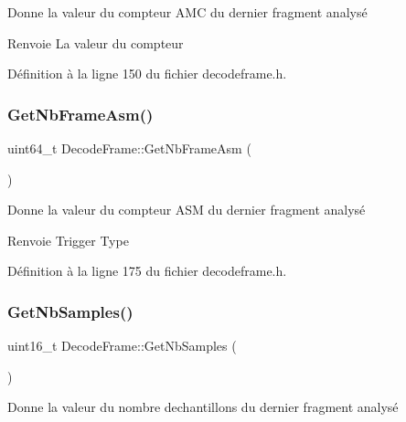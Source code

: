 Donne la valeur du compteur A\+MC du dernier fragment analysé 

\begin{DoxyReturn}{Renvoie}
La valeur du compteur 
\end{DoxyReturn}


Définition à la ligne 150 du fichier decodeframe.\+h.

\mbox{\label{class_decode_frame_affbc2d0f3774cb4fff34b42c446a5955}} 
\subsubsection{\texorpdfstring{Get\+Nb\+Frame\+Asm()}{GetNbFrameAsm()}}
{\footnotesize\ttfamily uint64\+\_\+t Decode\+Frame\+::\+Get\+Nb\+Frame\+Asm (\begin{DoxyParamCaption}{ }\end{DoxyParamCaption})\hspace{0.3cm}{\ttfamily [inline]}}



Donne la valeur du compteur A\+SM du dernier fragment analysé 

\begin{DoxyReturn}{Renvoie}
Trigger Type 
\end{DoxyReturn}


Définition à la ligne 175 du fichier decodeframe.\+h.

\mbox{\label{class_decode_frame_a97752547e2e402603dccf279928cd347}} 
\subsubsection{\texorpdfstring{Get\+Nb\+Samples()}{GetNbSamples()}}
{\footnotesize\ttfamily uint16\+\_\+t Decode\+Frame\+::\+Get\+Nb\+Samples (\begin{DoxyParamCaption}{ }\end{DoxyParamCaption})\hspace{0.3cm}{\ttfamily [inline]}}



Donne la valeur du nombre d\textquotesingle{}echantillons du dernier fragment analysé 


